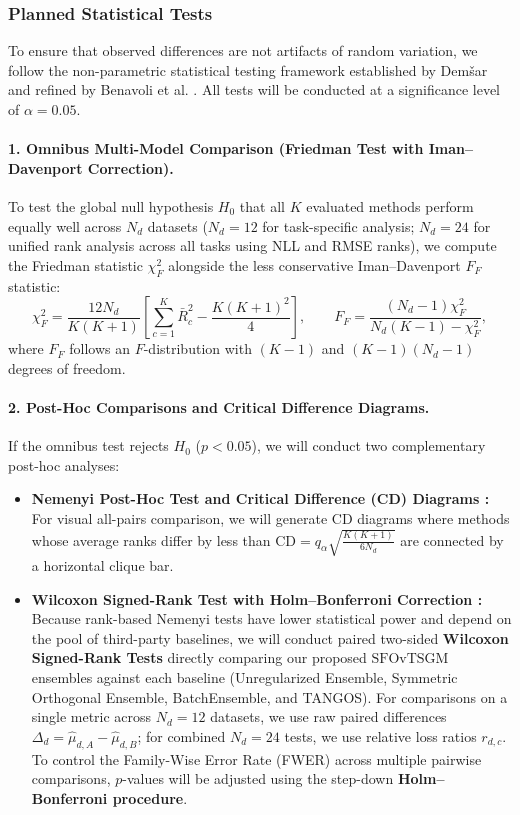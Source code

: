 \documentclass[11pt, a4paper]{article}
\begin{document}
\subsubsection{Planned Statistical Tests}
To ensure that observed differences are not artifacts of random variation, we follow the non-parametric statistical testing framework established by Dem\v{s}ar \cite{demsar2006statistical} and refined by Benavoli et al. \cite{benavoli2016should}. All tests will be conducted at a significance level of $\alpha = 0.05$.

\paragraph{1. Omnibus Multi-Model Comparison (Friedman Test with Iman--Davenport Correction).}
To test the global null hypothesis $H_0$ that all $K$ evaluated methods perform equally well across $N_d$ datasets ($N_d = 12$ for task-specific analysis; $N_d = 24$ for unified rank analysis across all tasks using NLL and RMSE ranks), we compute the Friedman statistic $\chi_F^2$ alongside the less conservative Iman--Davenport $F_F$ statistic:
\begin{equation}
    \chi_F^2 = \frac{12 N_d}{K(K+1)} \left[ \sum_{c=1}^{K} \bar{R}_c^2 - \frac{K(K+1)^2}{4} \right], \qquad 
    F_F = \frac{(N_d - 1)\chi_F^2}{N_d(K - 1) - \chi_F^2},
\end{equation}
where $F_F$ follows an $F$-distribution with $(K - 1)$ and $(K - 1)(N_d - 1)$ degrees of freedom.

\paragraph{2. Post-Hoc Comparisons and Critical Difference Diagrams.}
If the omnibus test rejects $H_0$ ($p < 0.05$), we will conduct two complementary post-hoc analyses:
\begin{itemize}
    \item \textbf{Nemenyi Post-Hoc Test and Critical Difference (CD) Diagrams \cite{demsar2006statistical}:} For visual all-pairs comparison, we will generate CD diagrams where methods whose average ranks differ by less than $\text{CD} = q_\alpha \sqrt{\frac{K(K+1)}{6 N_d}}$ are connected by a horizontal clique bar.
    \item \textbf{Wilcoxon Signed-Rank Test with Holm--Bonferroni Correction \cite{benavoli2016should}:} Because rank-based Nemenyi tests have lower statistical power and depend on the pool of third-party baselines, we will conduct paired two-sided \textbf{Wilcoxon Signed-Rank Tests} directly comparing our proposed $\text{SFOvTSGM}$ ensembles against each baseline (Unregularized Ensemble, Symmetric Orthogonal Ensemble, BatchEnsemble, and TANGOS). For comparisons on a single metric across $N_d = 12$ datasets, we use raw paired differences $\Delta_d = \hat{\mu}_{d,A} - \hat{\mu}_{d,B}$; for combined $N_d = 24$ tests, we use relative loss ratios $r_{d,c}$. To control the Family-Wise Error Rate (FWER) across multiple pairwise comparisons, $p$-values will be adjusted using the step-down \textbf{Holm--Bonferroni procedure}.
\end{itemize}
\end{document}
